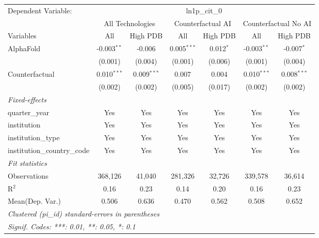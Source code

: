 \begingroup
\centering
\begin{tabular}{lcccccc}
   \tabularnewline \midrule \midrule
   Dependent Variable: & \multicolumn{6}{c}{ln1p\_cit\_0}\\
 & \multicolumn{2}{c}{All Technologies} & \multicolumn{2}{c}{Counterfactual AI} & \multicolumn{2}{c}{Counterfactual No AI} \\
\cmidrule(lr){1-1}\cmidrule(lr){2-3} \cmidrule(lr){4-5} \cmidrule(lr){6-7}
Variables & \multicolumn{1}{c}{All} & \multicolumn{1}{c}{High PDB} & \multicolumn{1}{c}{All} & \multicolumn{1}{c}{High PDB} & \multicolumn{1}{c}{All} & \multicolumn{1}{c}{High PDB} \\
\cmidrule(lr){1-1}\cmidrule(lr){2-2} \cmidrule(lr){3-3} \cmidrule(lr){4-4} \cmidrule(lr){5-5} \cmidrule(lr){6-6} \cmidrule(lr){7-7}
   AlphaFold                    & -0.003$^{**}$ & -0.006        & 0.005$^{***}$ & 0.012$^{*}$ & -0.003$^{**}$ & -0.007$^{*}$\\   
                                & (0.001)       & (0.004)       & (0.001)       & (0.006)     & (0.001)       & (0.004)\\   
   Counterfactual               & 0.010$^{***}$ & 0.009$^{***}$ & 0.007         & 0.004       & 0.010$^{***}$ & 0.008$^{***}$\\   
                                & (0.002)       & (0.002)       & (0.005)       & (0.017)     & (0.002)       & (0.002)\\   
   \midrule
   \emph{Fixed-effects}\\
   quarter\_year                & Yes           & Yes           & Yes           & Yes         & Yes           & Yes\\  
   institution                  & Yes           & Yes           & Yes           & Yes         & Yes           & Yes\\  
   institution\_type            & Yes           & Yes           & Yes           & Yes         & Yes           & Yes\\  
   institution\_country\_code   & Yes           & Yes           & Yes           & Yes         & Yes           & Yes\\  
   \midrule
   \emph{Fit statistics}\\
   Observations                 & 368,126       & 41,040        & 281,326       & 32,726      & 339,578       & 36,614\\  
   R$^2$                        & 0.16          & 0.23          & 0.14          & 0.20        & 0.16          & 0.23\\  
Mean(Dep. Var.) & 0.506 & 0.636 & 0.470 & 0.562 & 0.508 & 0.652 \\
   \midrule \midrule
   \multicolumn{7}{l}{\emph{Clustered (pi\_id) standard-errors in parentheses}}\\
   \multicolumn{7}{l}{\emph{Signif. Codes: ***: 0.01, **: 0.05, *: 0.1}}\\
\end{tabular}
\par\endgroup
